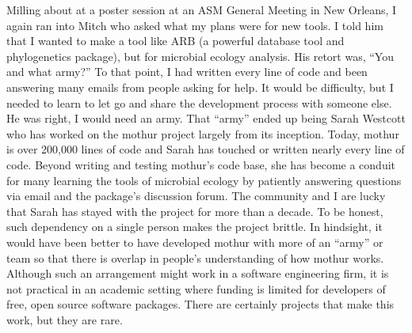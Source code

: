 \documentclass[11pt,]{article}
\begin{document}
Milling about at a poster session at an ASM General Meeting in New
Orleans, I again ran into Mitch who asked what my plans were for new
tools. I told him that I wanted to make a tool like ARB (a powerful
database tool and phylogenetics package), but for microbial ecology
analysis. His retort was, ``You and what army?'' To that point, I had
written every line of code and been answering many emails from people
asking for help. It would be difficulty, but I needed to learn to let go
and share the development process with someone else. He was right, I
would need an army. That ``army'' ended up being Sarah Westcott who has
worked on the mothur project largely from its inception. Today, mothur
is over 200,000 lines of code and Sarah has touched or written nearly
every line of code. Beyond writing and testing mothur's code base, she
has become a conduit for many learning the tools of microbial ecology by
patiently answering questions via email and the package's discussion
forum. The community and I are lucky that Sarah has stayed with the
project for more than a decade. To be honest, such dependency on a
single person makes the project brittle. In hindsight, it would have
been better to have developed mothur with more of an ``army'' or team so
that there is overlap in people's understanding of how mothur works.
Although such an arrangement might work in a software engineering firm,
it is not practical in an academic setting where funding is limited for
developers of free, open source software packages. There are certainly
projects that make this work, but they are rare.
\end{document}
